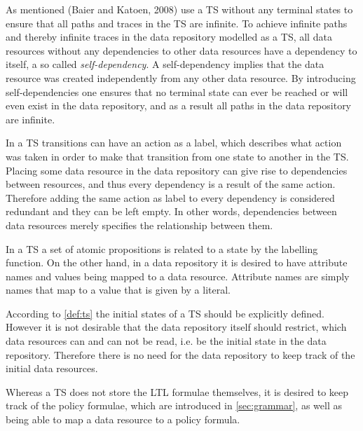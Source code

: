 As mentioned (Baier and Katoen, 2008)\cite{baier2008principles} use a TS without any terminal states to ensure that all paths and traces in the TS are infinite. To achieve infinite paths and thereby infinite traces in the data repository modelled as a TS, all data resources without any dependencies to other data resources have a dependency to itself, a so called \emph{self-dependency}. A self-dependency implies that the data resource was created independently from any other data resource. By introducing self-dependencies one ensures that no terminal state can ever be reached or will even exist in the data repository, and as a result all paths in the data repository are infinite.

In a TS transitions can have an action as a label, which describes what action was taken in order to make that transition from one state to another in the TS. Placing some data resource in the data repository can give rise to dependencies between resources, and thus every dependency is a result of the same action. Therefore adding the same action as label to every dependency is considered redundant and they can be left empty. In other words, dependencies between data resources merely specifies the relationship between them.

In a TS a set of atomic propositions is related to a state by the labelling function. On the other hand, in a data repository it is desired to have attribute names and values being mapped to a data resource. Attribute names are simply names that map to a value that is given by a literal.

According to \autoref{def:ts} the initial states of a TS should be explicitly defined. However it is not desirable that the data repository itself should restrict, which data resources can and can not be read, i.e. be the initial state in the data repository. Therefore there is no need for the data repository to keep track of the initial data resources.

Whereas a TS does not store the LTL formulae themselves, it is desired to keep track of the policy formulae, which are introduced in \autoref{sec:grammar}, as well as being able to map a data resource to a policy formula.

